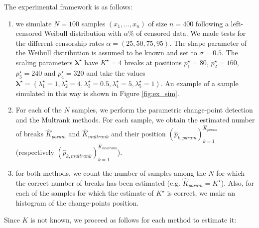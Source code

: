 The experimental framework is as follows: 
    \begin{enumerate}
        \item we simulate $N=100$ samples $(x_1,...,x_n)$ of size $n=400$  following a left-censored Weibull distribution with $\alpha\%$ of censored data. We made tests for the different censorship rates $\alpha = (25,50,75,95)$. The shape parameter of the Weibull distribution is assumed to be known and set to $\sigma=0.5$. The scaling parameters $\bm{\lambda^\star}$ have $K^\star=4$ breaks at positions $p^\star_1 = 80$, $p^\star_2 = 160$, $p^\star_3 = 240$ and $p^\star_4 = 320$ and take the values $\bm{\lambda^\star}=(\lambda^\star_1 = 1, \lambda^\star_2 = 4, \lambda^\star_3 = 0.5, \lambda^\star_4 = 5, \lambda^\star_5 = 1)$. An example of a sample simulated in this way is shown in Figure \ref{fig:ex_sim}.
        \item For each of the $N$ samples, we perform the parametric change-point detection and the Multrank methods. For each sample, we obtain the estimated number of breaks $\hat K_{param}$ and $\hat K_{multrank}$ and their position $(\hat{p}_{k,param})_{k = 1}^{\hat K_{param}}$ (respectively $(\hat{p}_{k,multrank})_{k = 1}^{\hat K_{multrank}}$).
        \item for both methods, we count the number of samples among the $N$ for which the correct number of breaks has been estimated (e.g. $\hat K_{param} = K^\star$). Also, for each of the samples for which the estimate of $K^\star$ is correct, we make an histogram of the change-points position. 
    \end{enumerate}
Since $K$ is not known, we proceed as follows for each method to estimate it:
